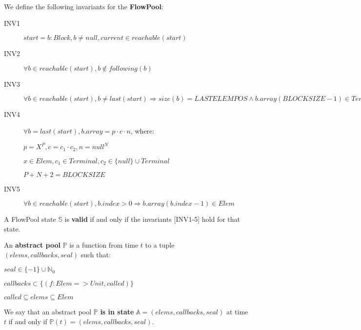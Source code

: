\begin{definitiontwo}[Invariants]
We define the following invariants for the \textbf{FlowPool}:
\begin{description}
\item[INV1] $start = b: Block, b \neq null, current \in reachable(start)$
\item[INV2] $\forall b \in reachable(start), b \not \in following(b)$
\item[INV3] $\forall b \in reachable(start), b \neq last(start) \Rightarrow size(b) = LASTELEMPOS \wedge b.array(BLOCKSIZE - 1) \in Terminal$
\item[INV4]
$\forall b = last(start), b.array = p \cdot c \cdot n$, where:

$p = X^P, c = c_1 \cdot c_2, n = null^N$

$x \in Elem, c_1 \in Terminal, c_2 \in \{null\} \cup Terminal$

$P + N + 2 = BLOCKSIZE$
\item[INV5] $\forall b \in reachable(start), b.index > 0 \Rightarrow b.array(b.index - 1) \in Elem$
\end{description}
\end{definitiontwo}


\begin{definitiontwo}[Validity]
A FlowPool state $\mathbb{S}$ is \textbf{valid} if and only if the invariants [INV1-5] hold for that state.
\end{definitiontwo}


\begin{definitiontwo}
An \textbf{abstract pool} $\mathbb{P}$ is a function from time $t$ to a tuple $(elems, callbacks, seal)$ such that:
\begin{description}
\item $seal \in \{ -1 \} \cup \mathbb{N}_0$
\item $callbacks \subset \{ (f: Elem => Unit, called) \}$
\item $called \subseteq elems \subseteq Elem$
\end{description}
We say that an abstract pool $\mathbb{P}$ \textbf{is in state}
$\mathbb{A} = (elems, callbacks, seal)$ at time $t$ if and only if $\mathbb{P}(t) = (elems, callbacks, seal)$.
\end{definitiontwo}


